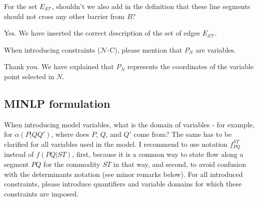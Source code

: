 \documentclass{article}
\newenvironment{reviewer}{\setcounter{pointcounter}{1}}{}
\newcommand{\point}{\text{{\selectfont \thepointcounter} \stepcounter{pointcounter}}}
\begin{document}
\begin{reviewer}
		\begin{itshape}
			For the set $E_{\mathcal S \mathcal T}$, shouldn't we also add in the definition that these line segments should not cross any other barrier from $B$?
		\end{itshape}
		
		\begin{tcolorbox}[breakable,enhanced,coltitle=black,colback=green!5!white,colframe=green!75!black,title=\textbf{Answer R2.\point},borderline={1pt}{0pt}{black},boxrule=0pt]
			Yes. We have inserted the correct description of the set of edges $E_{\mathcal S\mathcal T}$.
		\end{tcolorbox}
		
		\begin{itshape}
			When introducing constraints ($\mathcal N$-C), please mention that $P_N$ are variables.
		\end{itshape}
		
		\begin{tcolorbox}[breakable,enhanced,coltitle=black,colback=green!5!white,colframe=green!75!black,title=\textbf{Answer R2.\point},borderline={1pt}{0pt}{black},boxrule=0pt]
			Thank you. We have explained that $P_N$ represents the coordinates of the variable point selected in $N$.
		\end{tcolorbox}
		
		\subsection*{MINLP formulation}
		\begin{itshape}
			When introducing model variables, what is the domain of variables - for example, for $\alpha(P|QQ')$, where does $P$, $Q$, and $Q'$ come from? The same has to be clarified for all variables used in the model. I recommend to use notation $f^{ST}_{PQ}$ instead of $f(PQ|ST)$, first, because it is a common way to state flow along a segment $PQ$ for the commodity $ST$ in that way, and second, to avoid confusion with the determinants notation (see minor remarks below). For all introduced constraints, please introduce quantifiers and variable domains for which these constraints are imposed.
		\end{itshape}
		

\end{reviewer}
\end{document}
